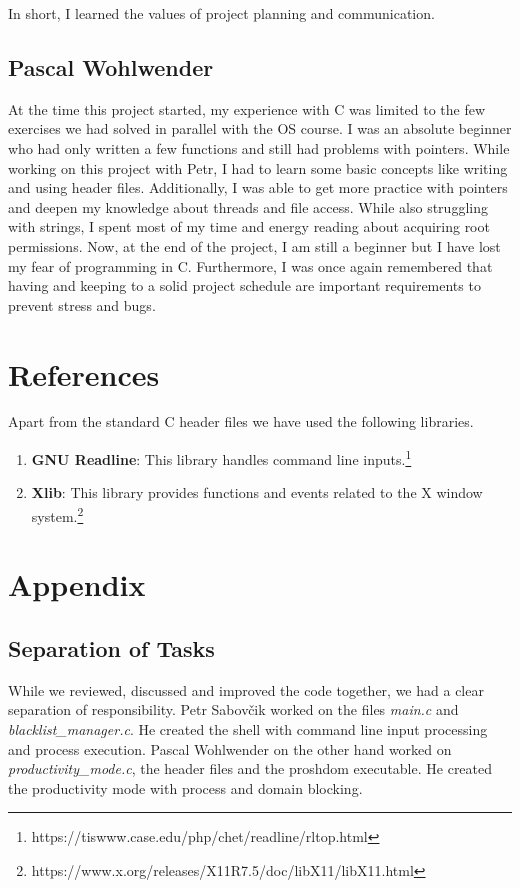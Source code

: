 \documentclass{article}
\begin{document}
In short, I learned the values of project planning and communication.


\subsection{Pascal Wohlwender}

At the time this project started, my experience with C was limited to the few exercises we had solved in parallel with the OS course. I was an absolute beginner who had only written a few functions and still had problems with pointers. While working on this project with Petr, I had to learn some basic concepts like writing and using header files. Additionally, I was able to get more practice with pointers and deepen my knowledge about threads and file access. While also struggling with strings, I spent most of my time and energy reading about acquiring root permissions. Now, at the end of the project, I am still a beginner but I have lost my fear of programming in C. Furthermore, I was once again remembered that having and keeping to a solid project schedule are important requirements to prevent stress and bugs.

\section{References}

Apart from the standard C header files we have used the following libraries.

\begin{enumerate}
	\item \textbf{GNU Readline}: This library handles command line inputs.\footnote{https://tiswww.case.edu/php/chet/readline/rltop.html}
	\item \textbf{Xlib}: This library provides functions and events related to the X window system.\footnote{https://www.x.org/releases/X11R7.5/doc/libX11/libX11.html}
\end{enumerate}

\pagebreak

\section{Appendix}

\subsection{Separation of Tasks}

While we reviewed, discussed and improved the code together, we had a clear separation of responsibility. Petr Sabovčik worked on the files \textit{main.c} and \textit{blacklist\_manager.c}. He created the shell with command line input processing and process execution. Pascal Wohlwender on the other hand worked on \textit{productivity\_mode.c}, the header files and the proshdom executable. He created the productivity mode with process and domain blocking.
\end{document}
